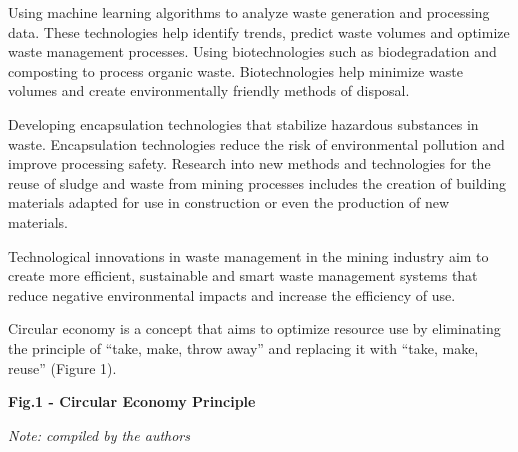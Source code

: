\begin{multicols}{2}
Using machine learning algorithms to analyze waste generation and
processing data. These technologies help identify trends, predict waste
volumes and optimize waste management processes. Using biotechnologies
such as biodegradation and composting to process organic waste.
Biotechnologies help minimize waste volumes and create environmentally
friendly methods of disposal.

Developing encapsulation technologies that stabilize hazardous
substances in waste. Encapsulation technologies reduce the risk of
environmental pollution and improve processing safety. Research into new
methods and technologies for the reuse of sludge and waste from mining
processes includes the creation of building materials adapted for use in
construction or even the production of new materials.

Technological innovations in waste management in the mining industry aim
to create more efficient, sustainable and smart waste management systems
that reduce negative environmental impacts and increase the efficiency
of use.

Circular economy is a concept that aims to optimize resource use by
eliminating the principle of ``take, make, throw away'' and replacing it
with ``take, make, reuse'' (Figure 1).
\end{multicols}

{\bfseries Fig.1 - Circular Economy Principle}

\emph{Note: compiled by the authors}

